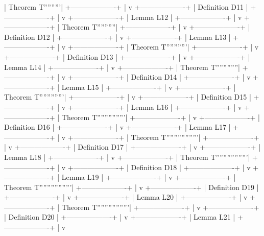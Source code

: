 | Theorem T'''''''''|
+-------------------+
        |
        v
+-------------------+
| Definition D11    |
+-------------------+
        |
        v
+-------------------+
| Lemma L12         |
+-------------------+
        |
        v
+-------------------+
| Theorem T''''''''''|
+-------------------+
        |
        v
+-------------------+
| Definition D12    |
+-------------------+
        |
        v
+-------------------+
| Lemma L13         |
+-------------------+
        |
        v
+-------------------+
| Theorem T'''''''''''|
+-------------------+
        |
        v
+-------------------+
| Definition D13    |
+-------------------+
        |
        v
+-------------------+
| Lemma L14         |
+-------------------+
        |
        v
+-------------------+
| Theorem T''''''''''''|
+-------------------+
        |
        v
+-------------------+
| Definition D14    |
+-------------------+
        |
        v
+-------------------+
| Lemma L15         |
+-------------------+
        |
        v
+-------------------+
| Theorem T'''''''''''''|
+-------------------+
        |
        v
+-------------------+
| Definition D15    |
+-------------------+
        |
        v
+-------------------+
| Lemma L16         |
+-------------------+
        |
        v
+-------------------+
| Theorem T'''''''''''''''|
+-------------------+
        |
        v
+-------------------+
| Definition D16    |
+-------------------+
        |
        v
+-------------------+
| Lemma L17         |
+-------------------+
        |
        v
+-------------------+
| Theorem T'''''''''''''''''|
+-------------------+
        |
        v
+-------------------+
| Definition D17    |
+-------------------+
        |
        v
+-------------------+
| Lemma L18         |
+-------------------+
        |
        v
+-------------------+
| Theorem T'''''''''''''''''|
+-------------------+
        |
        v
+-------------------+
| Definition D18    |
+-------------------+
        |
        v
+-------------------+
| Lemma L19         |
+-------------------+
        |
        v
+-------------------+
| Theorem T'''''''''''''''''|
+-------------------+
        |
        v
+-------------------+
| Definition D19    |
+-------------------+
        |
        v
+-------------------+
| Lemma L20         |
+-------------------+
        |
        v
+-------------------+
| Theorem T'''''''''''''''''|
+-------------------+
        |
        v
+-------------------+
| Definition D20    |
+-------------------+
        |
        v
+-------------------+
| Lemma L21         |
+-------------------+
        |
        v
